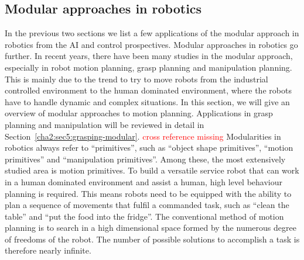 
%
%







\subsection{Modular approaches in robotics}
\label{cha2:sec3:robotics}
In the previous two sections we list a few applications of the modular approach in robotics from the AI and control prospectives. Modular approaches in robotics go further. In recent years, there have been many studies in the modular approach, especially in robot motion planning, grasp planning and manipulation planning. This is mainly due to the trend to try to move robots from the industrial controlled environment to the human dominated environment, where the robots have to handle dynamic and complex situations. In this section, we will give an overview of modular approaches to motion planning. Applications in grasp planning and manipulation will be reviewed in detail in Section~\ref{cha2:sec5:grasping-modular}.
\textcolor{red}{cross reference missing}
Modularities in robotics always refer to ``primitives'', such as ``object shape primitives'', ``motion primitives'' and ``manipulation primitives''. Among these, the most extensively studied area is motion primitives.
To build a versatile service robot that can work in a human dominated environment and assist a human, high level behaviour planning is required. This means robots need to be equipped with the ability to plan a sequence of movements that fulfil a commanded task, such as ``clean the table'' and ``put the food into the fridge''. The conventional method of motion planning is to search in a high dimensional space formed by the numerous degree of freedoms of the robot. The number of possible solutions to accomplish a task is therefore nearly infinite.


